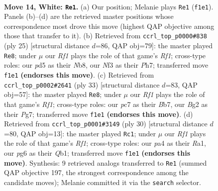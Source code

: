 \documentclass[11pt]{article}
\begin{document}
\clearpage

\begin{figure}[p]\centering
\begin{subfigure}{0.46\textwidth}\centering
\resizebox{\linewidth}{!}{%
\newchessgame
\chessboard[
  setfen={r1b1k2r/2p1qp2/2n2np1/p2p3p/p2P4/2B2NP1/1P2PPBP/R2Q1RK1 w kq - 0 14},
  showmover=false,
  pgfstyle=straightmove, color=movearrow, markmove={f1-e1}
]}
\caption{}
\end{subfigure}\hfill
\begin{subfigure}{0.46\textwidth}\centering
\resizebox{\linewidth}{!}{%
\newchessgame
\chessboard[
  setfen={rn1q1rk1/1b2bppp/p2p1n2/P1pP4/2B5/2N2N1P/1P3PP1/R1BQK2R b KQ - 0 13},
  showmover=false,
  pgfstyle=straightmove, color=movearrow, markmove={f8-e8}
]}
\caption{}
\end{subfigure}
\\[4pt]
\begin{subfigure}{0.46\textwidth}\centering
\resizebox{\linewidth}{!}{%
\newchessgame
\chessboard[
  setfen={r2q1rk1/1bp3pp/p1nb1p2/1p6/3P2N1/PP5P/1P2NPP1/R1BQR1K1 b - - 0 17},
  showmover=false,
  pgfstyle=straightmove, color=movearrow, markmove={f8-e8}
]}
\caption{}
\end{subfigure}\hfill
\begin{subfigure}{0.46\textwidth}\centering
\resizebox{\linewidth}{!}{%
\newchessgame
\chessboard[
  setfen={r4rk1/1p3pp1/pqn2n1p/8/PP1p2b1/5NP1/3BPPBP/RQ3RK1 w - - 0 16},
  showmover=false,
  pgfstyle=straightmove, color=movearrow, markmove={f1-c1}
]}
\caption{}
\end{subfigure}
\caption{\textbf{Move 14, White: \texttt{Re1}.} (a) Our position; Melanie plays \texttt{Re1} (\texttt{f1e1}). Panels (b)--(d) are the retrieved master positions whose correspondence most drove this move (highest QAP objective among those that transfer to it). (b) Retrieved from \texttt{ccrl\_top\_p0000\#838} (ply 25) [structural distance $d$=86, QAP obj=79]: the master played \texttt{Re8}; under $\mu$ our \emph{Rf1} plays the role of that game's \emph{Rf1}; cross-type roles: our \emph{p}d5 as their \emph{N}b8, our \emph{N}f3 as their \emph{P}h7; transferred move \texttt{f1e1} \textbf{(endorses this move)}. (c) Retrieved from \texttt{ccrl\_top\_p0002\#2641} (ply 33) [structural distance $d$=83, QAP obj=57]: the master played \texttt{Re8}; under $\mu$ our \emph{Rf1} plays the role of that game's \emph{Rf1}; cross-type roles: our \emph{p}c7 as their \emph{B}b7, our \emph{B}g2 as their \emph{P}g7; transferred move \texttt{f1e1} \textbf{(endorses this move)}. (d) Retrieved from \texttt{ccrl\_top\_p0001\#3149} (ply 30) [structural distance $d$=80, QAP obj=13]: the master played \texttt{Rc1}; under $\mu$ our \emph{Rf1} plays the role of that game's \emph{Rf1}; cross-type roles: our \emph{p}a4 as their \emph{R}a1, our \emph{p}g6 as their \emph{Q}b1; transferred move \texttt{f1e1} \textbf{(endorses this move)}. Synthesis: 9 retrieved analogs transferred to \texttt{Re1} (summed QAP objective 197, the strongest correspondence among the candidate moves); Melanie committed it via the \texttt{search} selector.}
\label{fig:thought-m26}
\end{figure}
\end{document}
